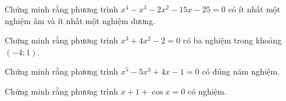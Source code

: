 \begin{bt}%
	Chứng minh rằng phương trình $x^4 - x^3 - 2x^2 - 15x - 25 = 0$ có ít nhất một nghiệm âm và ít nhất một nghiệm dương.
\end{bt} 

\begin{bt}%
	Chứng minh rằng phương trình $x^3 + 4x^2 - 2 = 0$ có ba nghiệm trong khoảng $(-4; 1)$.
\end{bt} 

\begin{bt}%
	Chứng minh rằng phương trình $x^5 - 5x^3 + 4x - 1 = 0$ có đúng năm nghiệm.
\end{bt} 

\begin{bt}
	Chứng minh rằng phương trình $x+1+\cos x=0$  có nghiệm.
\end{bt} 

